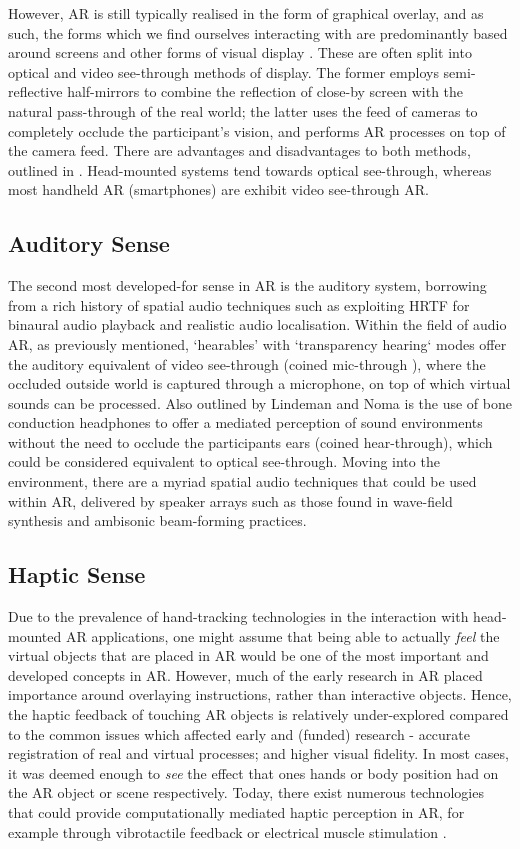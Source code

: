 However, AR is still typically realised in the form of graphical overlay, and as such, the forms which we find ourselves interacting with are predominantly based around screens and other forms of visual display \citep{dey2018}. These are often split into optical and video see-through methods of display. The former employs semi-reflective half-mirrors to combine the reflection of close-by screen with the natural pass-through of the real world; the latter uses the feed of cameras to completely occlude the participant's vision, and performs AR processes on top of the camera feed. There are advantages and disadvantages to both methods, outlined in \citep{rolland2000}. Head-mounted systems tend towards optical see-through, whereas most handheld AR (smartphones) are exhibit video see-through AR.

\subsection{Auditory Sense}\label{sec: ar-sensory-auditory}
The second most developed-for sense in AR is the auditory system, borrowing from a rich history of spatial audio techniques such as exploiting HRTF for binaural audio playback and realistic audio localisation. Within the field of audio AR, as previously mentioned, `hearables' with `transparency hearing` modes offer the auditory equivalent of video see-through (coined mic-through \citep{lindeman2008}), where the occluded outside world is captured through a microphone, on top of which virtual sounds can be processed. Also outlined by Lindeman and Noma is the use of bone conduction headphones to offer a mediated perception of sound environments without the need to occlude the participants ears (coined hear-through), which could be considered equivalent to optical see-through. Moving into the environment, there are a myriad spatial audio techniques that could be used within AR, delivered by speaker arrays such as those found in wave-field synthesis and ambisonic beam-forming practices.

\subsection{Haptic Sense}\label{sec: ar-sensory-haptic}
Due to the prevalence of hand-tracking technologies in the interaction with head-mounted AR applications, one might assume that being able to actually \textit{feel} the virtual objects that are placed in AR would be one of the most important and developed concepts in AR. However, much of the early research in AR placed importance around overlaying instructions, rather than interactive objects. Hence, the haptic feedback of touching AR objects is relatively under-explored compared to the common issues which affected early and (funded) research - accurate registration of real and virtual processes; and higher visual fidelity. In most cases, it was deemed enough to \textit{see} the effect that ones hands or body position had on the AR object or scene respectively. Today, there exist numerous technologies that could provide computationally mediated haptic perception in AR, for example through vibrotactile feedback or electrical muscle stimulation \citep{lopes2018}.

